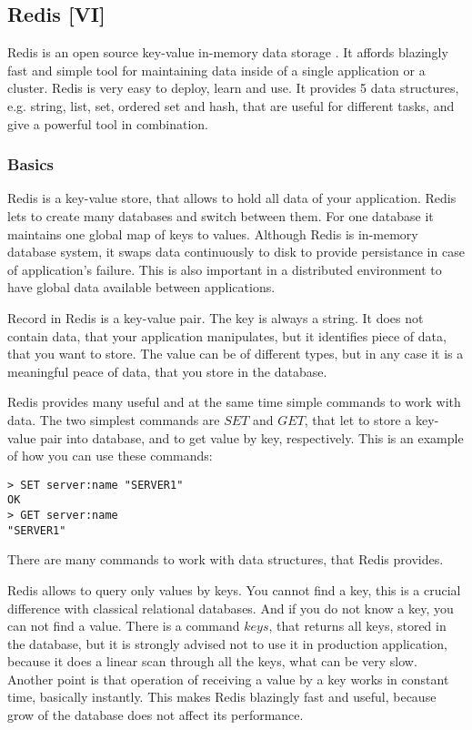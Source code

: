 \subsection{Redis [VI]}

Redis is an open source key-value in-memory data storage \cite{Seguin2012} \cite{Redis}.
It affords blazingly fast and simple tool for maintaining data inside of a single application or a cluster.
Redis is very easy to deploy, learn and use.
It provides 5 data structures, e.g. string, list, set, ordered set and hash, that are useful for different tasks, and give a powerful tool in combination.

\subsubsection{Basics}

Redis is a key-value store, that allows to hold all data of your application.
Redis lets to create many databases and switch between them.
For one database it maintains one global map of keys to values.
Although Redis is in-memory database system, it swaps data continuously to disk to provide persistance in case of application's failure.
This is also important in a distributed environment to have global data available between applications.

Record in Redis is a key-value pair.
The key is always a string.
It does not contain data, that your application manipulates, but it identifies piece of data, that you want to store.
The value can be of different types, but in any case it is a meaningful peace of data, that you store in the database.

Redis provides many useful and at the same time simple commands to work with data.
The two simplest commands are $SET$ and $GET$, that let to store a key-value pair into database, and to get value by key, respectively.
This is an example of how you can use these commands:
\begin{verbatim}
> SET server:name "SERVER1"
OK
> GET server:name
"SERVER1"
\end{verbatim}
There are many commands to work with data structures, that Redis provides.

Redis allows to query only values by keys.
You cannot find a key, this is a crucial difference with classical relational databases.
And if you do not know a key, you can not find a value.
There is a command $keys$, that returns all keys, stored in the database, but it is strongly advised not to use it in production application, because it does a linear scan through all the keys, what can be very slow.
Another point is that operation of receiving a value by a key works in constant time, basically instantly.
This makes Redis blazingly fast and useful, because grow of the database does not affect its performance.

